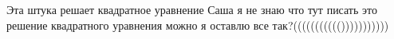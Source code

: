  Эта штука решает квадратное уравнение Саша я не знаю что тут писать это решение квадратного уравнения можно я оставлю все так?((((((((((())))))))))) 
 
